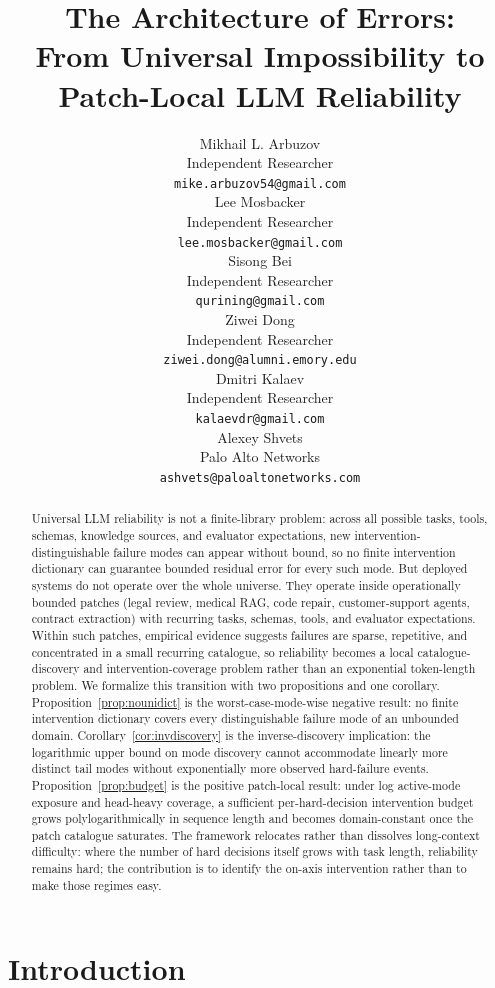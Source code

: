 \documentclass{article}
\title{The Architecture of Errors:\\From Universal Impossibility to Patch-Local LLM Reliability}
\author{%
  Mikhail L. Arbuzov\\
  Independent Researcher\\
  \texttt{mike.arbuzov54@gmail.com}\\
  \And
  Lee Mosbacker\\
  Independent Researcher\\
  \texttt{lee.mosbacker@gmail.com}\\
  \And
  Sisong Bei\\
  Independent Researcher\\
  \texttt{qurining@gmail.com}\\
  \AND
  Ziwei Dong\\
  Independent Researcher\\
  \texttt{ziwei.dong@alumni.emory.edu}\\
  \And
  Dmitri Kalaev\\
  Independent Researcher\\
  \texttt{kalaevdr@gmail.com}\\
  \And
  Alexey Shvets\\
  Palo Alto Networks\\
  \texttt{ashvets@paloaltonetworks.com}\\
}
\theoremstyle{taeplain}
\theoremstyle{taedefn}
\begin{document}
\maketitle

\begin{abstract}
Universal LLM reliability is not a finite-library problem: across all possible tasks, tools, schemas, knowledge sources, and evaluator expectations, new intervention-distinguishable failure modes can appear without bound, so no finite intervention dictionary can guarantee bounded residual error for every such mode. But deployed systems do not operate over the whole universe. They operate inside operationally bounded patches (legal review, medical RAG, code repair, customer-support agents, contract extraction) with recurring tasks, schemas, tools, and evaluator expectations. Within such patches, empirical evidence suggests failures are sparse, repetitive, and concentrated in a small recurring catalogue, so reliability becomes a local catalogue-discovery and intervention-coverage problem rather than an exponential token-length problem. We formalize this transition with two propositions and one corollary. Proposition~\ref{prop:nounidict} is the worst-case-mode-wise negative result: no finite intervention dictionary covers every distinguishable failure mode of an unbounded domain. Corollary~\ref{cor:invdiscovery} is the inverse-discovery implication: the logarithmic upper bound on mode discovery cannot accommodate linearly more distinct tail modes without exponentially more observed hard-failure events. Proposition~\ref{prop:budget} is the positive patch-local result: under log active-mode exposure and head-heavy coverage, a sufficient per-hard-decision intervention budget grows polylogarithmically in sequence length and becomes domain-constant once the patch catalogue saturates. The framework relocates rather than dissolves long-context difficulty: where the number of hard decisions itself grows with task length, reliability remains hard; the contribution is to identify the on-axis intervention rather than to make those regimes easy.
\end{abstract}

\section{Introduction}
\label{sec:intro}
\end{document}
